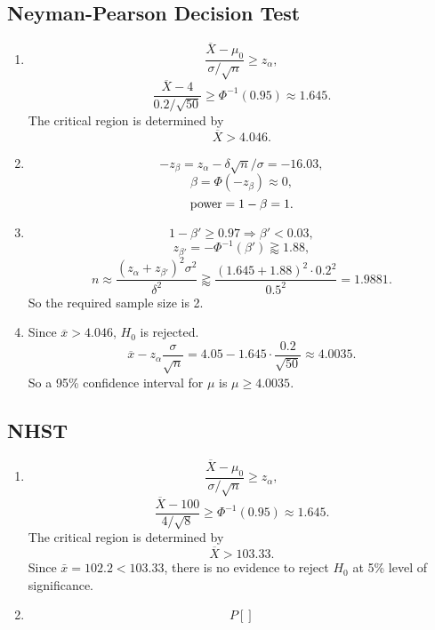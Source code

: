 \documentclass[11pt,a4paper]{article}
\author{Group 37}
\subtitle{Assignment}
\begin{document}
\maketitle

\subsection{Neyman-Pearson Decision Test}

\begin{enumerate}[label=\roman*)]
\item
$$\frac{\overline{X}-\mu_0}{\sigma/\sqrt{n}}\geqslant z_{\alpha},$$
$$\frac{\overline{X}-4}{0.2/\sqrt{50}}\geqslant\Phi^{-1}(0.95)\approx1.645.$$
The critical region is determined by
$$\overline{X}>4.046.$$
\item
$$-z_{\beta}=z_\alpha-\delta\sqrt{n}/\sigma=-16.03,$$
$$\beta=\Phi(-z_{\beta})\approx 0,$$
$${\rm power}=1-\beta=1.$$
\item
$$1-\beta'\geqslant0.97\Longrightarrow\beta'<0.03,$$
$$z_{\beta'}=-\Phi^{-1}(\beta')\gtrapprox 1.88,$$
$$n\approx\frac{(z_\alpha+z_{\beta'})^2\sigma^2}{\delta^2}\gtrapprox\frac{(1.645+1.88)^2\cdot0.2^2}{0.5^2}=1.9881.$$
So the required sample size is 2.
\item
Since $\overline{x}>4.046$, $H_0$ is rejected.
$$\overline{x}-z_\alpha\frac{\sigma}{\sqrt{n}}=4.05-1.645\cdot\frac{0.2}{\sqrt{50}}\approx4.0035.$$
So a 95\% confidence interval for $\mu$ is $\mu\geqslant4.0035$.
\end{enumerate}

\subsection{NHST}

\begin{enumerate}[label=\roman*)]
\item
$$\frac{\overline{X}-\mu_0}{\sigma/\sqrt{n}}\geqslant z_{\alpha},$$
$$\frac{\overline{X}-100}{4/\sqrt{8}}\geqslant\Phi^{-1}(0.95)\approx1.645.$$
The critical region is determined by
$$\overline{X}>103.33.$$
Since $\bar{x}=102.2<103.33$, there is no evidence to reject $H_0$ at 5\% level of significance.
\item
$$P[]$$
\end{enumerate}

\subsection{}
\end{document}

